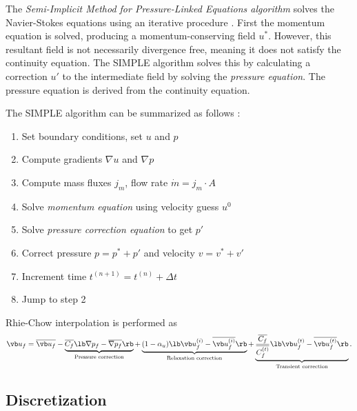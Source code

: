 \documentclass[12pt]{article}
\begin{document}
The \textit{Semi-Implicit Method for Pressure-Linked Equations algorithm} solves the Navier-Stokes equations using an iterative procedure \cite{pat}. First the momentum equation is solved, producing a momentum-conserving field $u^*$. However, this resultant field is not necessarily divergence free, meaning it does not satisfy the continuity equation. The SIMPLE algorithm solves this by calculating a correction $u'$ to the intermediate field by solving the \textit{pressure equation}. The pressure equation is derived from the continuity equation.

The SIMPLE algorithm can be summarized as follows \cite{mou, pat}:
\begin{enumerate}
\item Set boundary conditions, set $u$ and $p$
\item Compute gradients $\nabla u$ and $\nabla p$
\item Compute mass fluxes $j_m$, flow rate $\dot m = j_m \cdot A$
\item Solve \textit{momentum equation} using velocity guess $u^0$
\item Solve \textit{pressure correction equation} to get $p'$
\item Correct pressure $p = p^* + p'$ and velocity $v = v^* + v'$
\item Increment time $t^{(n+1)} = t^{(n)} + \Delta t$
\item Jump to step 2
\end{enumerate}
Rhie-Chow interpolation is performed as \cite{mou}
$$
\vb u_f = \overline{\vb u_f} - \underbrace{\overline{C_f} \lb \nabla p_f - \overline{\nabla p_f} \rb}_\text{Pressure correction} + \underbrace{(1 - \alpha_u) \lb \vb u_f^{(i)} - \overline{\vb u_f^{(i)}} \rb}_\text{Relaxation correction} + \underbrace{\frac{\overline{C_f}}{\overline{C_f^{(t)}}} \lb \vb u_f^{(t)} - \overline{\vb u_f^{(t)}} \rb}_\text{Transient correction}.
$$

\subsection{Discretization}
\end{document}
